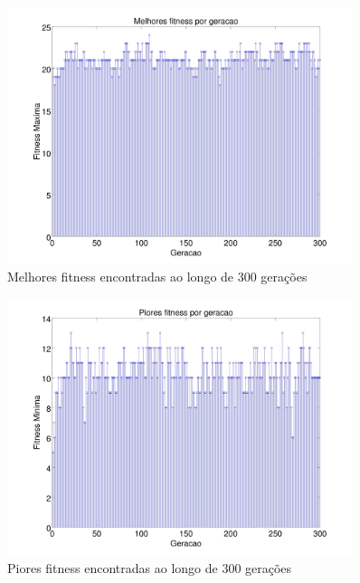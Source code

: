 \documentclass{report}
\begin{document}
	\begin{figure}[H]
		\centering
		\includegraphics[width = 0.9\textwidth]{Q02_melhores_fitness_300.jpg}
		\caption{Melhores fitness encontradas ao longo de 300 gerações}
		\label{melhores_fitness_300_q02}
	\end{figure}
	
	\begin{figure}[H]
		\centering
		\includegraphics[width = 0.9\textwidth]{Q02_piores_fitness_300.jpg}
		\caption{Piores fitness encontradas ao longo de 300 gerações}
		\label{piores_fitness_300_q02}
	\end{figure}
	
\end{document}
